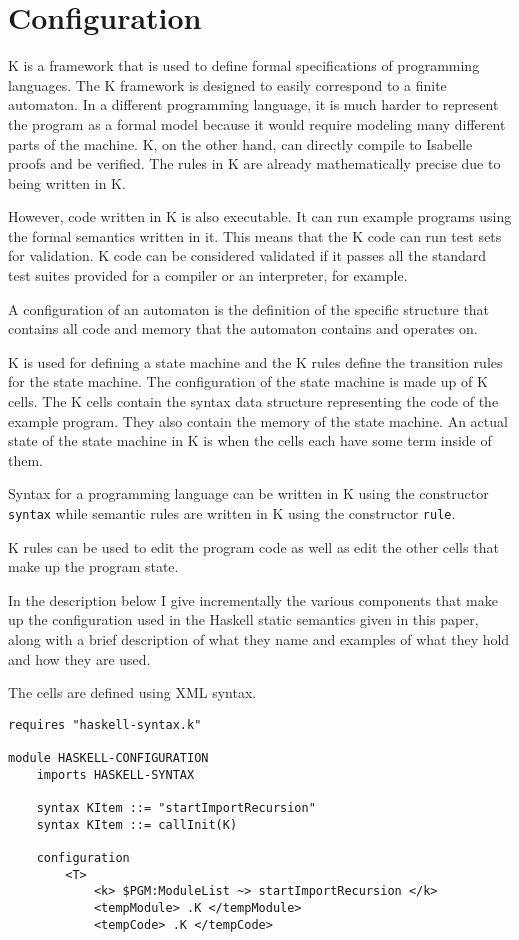 \chapter{Configuration}
K is a framework that is used to define formal specifications of programming languages. The K framework is designed to easily correspond to a finite automaton. In a different programming language, it is much harder to represent the program as a formal model because it would require modeling many different parts of the machine. K, on the other hand, can directly compile to Isabelle proofs and be verified. The rules in K are already mathematically precise due to being written in K.

However, code written in K is also executable. It can run example programs using the formal semantics written in it. This means that the K code can run test sets for validation. K code can be considered validated if it passes all the standard test suites provided for a compiler or an interpreter, for example.

A configuration of an automaton is the definition of the specific structure that contains all code and memory that the automaton contains and operates on.

K is used for defining a state machine and the K rules define the transition rules for the state machine. The configuration of the state machine is made up of K cells. The K cells contain the syntax data structure representing the code of the example program. They also contain the memory of the state machine. An actual state of the state machine in K is when the cells each have some term inside of them.

Syntax for a programming language can be written in K using the constructor \texttt{syntax} while semantic rules are written in K using the constructor \texttt{rule}.

K rules can be used to edit the program code as well as edit the other cells that make up the program state.

In the description below I give incrementally the various components that make up the configuration used in the Haskell static semantics given in this paper, along with a brief description of what they name and examples of what they hold and how they are used.

\noindent
The cells are defined using XML syntax.

\begin{lstlisting}
requires "haskell-syntax.k"

module HASKELL-CONFIGURATION
    imports HASKELL-SYNTAX

    syntax KItem ::= "startImportRecursion"
    syntax KItem ::= callInit(K)

    configuration 
        <T>
            <k> $PGM:ModuleList ~> startImportRecursion </k>
            <tempModule> .K </tempModule>
            <tempCode> .K </tempCode>
\end{lstlisting}

